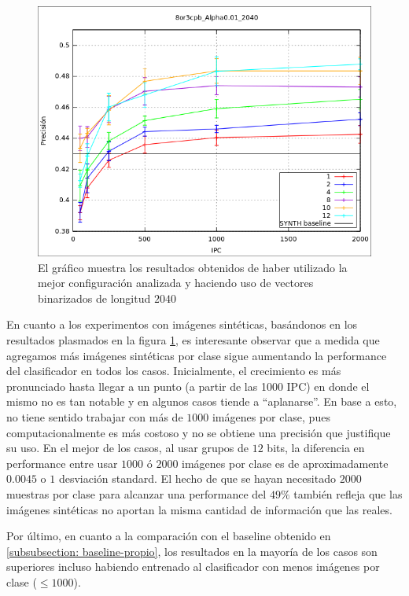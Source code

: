 			\begin{figure}[htbp]
				\centering
				\centerline{
					\includegraphics[scale=0.6]{img/resultados/sinteticas/mean_2040.png}
				}
				\caption[Sintéticas media 2040]{El gráfico muestra los resultados obtenidos de haber utilizado la mejor configuración analizada y haciendo uso de vectores binarizados de longitud $2040$}
				\label{fig: Sinteticas-media-2040}
			\end{figure}
	
	En cuanto a los experimentos con imágenes sintéticas, basándonos en los resultados plasmados en la figura \ref{fig: Sinteticas-media-2040}, es interesante observar que a medida que agregamos más imágenes sintéticas por clase sigue aumentando la performance del clasificador en todos los casos. Inicialmente, el crecimiento es más pronunciado hasta llegar a un punto (a partir de las 1000 IPC) en donde el mismo no es tan notable y en algunos casos tiende a ``aplanarse''. En base a esto, no tiene sentido trabajar con más de $1000$ imágenes por clase, pues computacionalmente es más costoso y no se obtiene una precisión que justifique su uso. En el mejor de los casos, al usar grupos de $12$ bits, la diferencia en performance entre usar $1000$ ó $2000$ imágenes por clase es de aproximadamente $0.0045$ o $1$ desviación standard. El hecho de que se hayan necesitado $2000$ muestras por clase para alcanzar una performance del $49\%$ también refleja que las imágenes sintéticas no aportan la misma cantidad de información que las reales.
	
	Por último, en cuanto a la comparación con el baseline obtenido en \ref{subsubsection: baseline-propio}, los resultados en la mayoría de los casos son superiores incluso habiendo entrenado al clasificador con menos imágenes por clase ($\leq 1000$).
			

